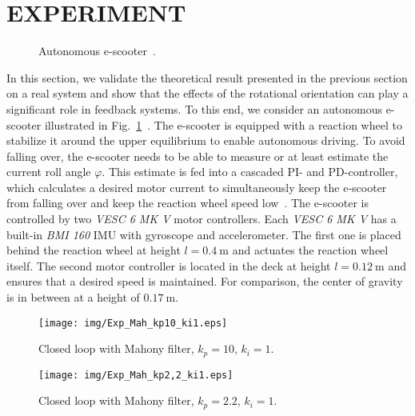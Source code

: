 \section{EXPERIMENT} \label{sec:Experiment}
\begin{figure}[tb]
	\centering
	\begin{minipage}{0.9\linewidth}
		\centering
		\hspace*{-0.1\linewidth}
		
	\end{minipage}
	\caption{Autonomous \ac{e-scooter}~\cite{Straesser2024}.}
	\label{IMG:Exp:EScooter}
\end{figure}
In this section, we validate the theoretical result presented in the previous section on a real system and show that the effects of the rotational orientation can play a significant role in feedback systems. 
To this end, we consider an autonomous \ac{e-scooter} illustrated in Fig.~\ref{IMG:Exp:EScooter}~\cite{Soloperto2021,Straesser2025}.
The \ac{e-scooter} is equipped with a reaction wheel to stabilize it around the upper equilibrium to enable autonomous driving.
To avoid falling over, the \ac{e-scooter} needs to be able to measure or at least estimate the current roll angle $\varphi$.
This estimate is fed into a cascaded PI- and PD-controller, which calculates a desired motor current to simultaneously keep the \ac{e-scooter} from falling over and keep the reaction wheel speed low~\cite{Wenzelburger2020}.
The \ac{e-scooter} is controlled by two \emph{VESC 6 MK V} motor controllers.
Each \emph{VESC 6 MK V} has a built-in \emph{BMI 160} \ac{IMU} with gyroscope and accelerometer.
The first one is placed behind the reaction wheel at height $l = \SI{0.4}{\meter}$ and actuates the reaction wheel itself.
The second motor controller is located in the deck at height $l = \SI{0.12}{\meter}$ and ensures that a desired speed is maintained.
For comparison, the center of gravity is in between at a height of $\SI{0.17}{\meter}$.
\begin{figure*}[tb]	
	\begin{minipage}{0.48\textwidth}
		\centering
		\texttt{[image: img/Exp\_Mah\_kp10\_ki1.eps]}
		\caption{Closed loop with Mahony filter, $k_p = 10$, $k_i = 1$.}
		\label{IMG:Exp:MahonyKp10Ki1}		
	\end{minipage}
	\begin{minipage}{0.04\textwidth}
	\end{minipage}
	\begin{minipage}{0.48\textwidth}
		\centering
		\texttt{[image: img/Exp\_Mah\_kp2,2\_ki1.eps]}
		\caption{Closed loop with Mahony filter, $k_p = 2.2$, $k_i = 1$.}
		\label{IMG:Exp:MahonyKp2,2Ki1}
	\end{minipage}		
\end{figure*}

